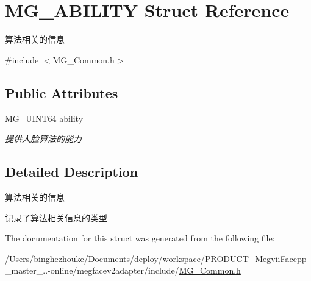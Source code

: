 \hypertarget{struct_m_g___a_b_i_l_i_t_y}{}\section{M\+G\+\_\+\+A\+B\+I\+L\+I\+TY Struct Reference}
\label{struct_m_g___a_b_i_l_i_t_y}


算法相关的信息  




{\ttfamily \#include $<$M\+G\+\_\+\+Common.\+h$>$}

\subsection*{Public Attributes}
\begin{DoxyCompactItemize}
\item 
\mbox{\label{struct_m_g___a_b_i_l_i_t_y_af734c4768b5313bdc14ab930ea484013}} 
M\+G\+\_\+\+U\+I\+N\+T64 \hyperlink{struct_m_g___a_b_i_l_i_t_y_af734c4768b5313bdc14ab930ea484013}{ability}
\begin{DoxyCompactList}\small\item\em 提供人脸算法的能力 \end{DoxyCompactList}\end{DoxyCompactItemize}


\subsection{Detailed Description}
算法相关的信息 

记录了算法相关信息的类型 

The documentation for this struct was generated from the following file\+:\begin{DoxyCompactItemize}
\item 
/\+Users/binghezhouke/\+Documents/deploy/workspace/\+P\+R\+O\+D\+U\+C\+T\+\_\+\+Megvii\+Facepp\+\_\+master\+\_..-\/online/megfacev2adapter/include/\hyperlink{_m_g___common_8h}{M\+G\+\_\+\+Common.\+h}\end{DoxyCompactItemize}
